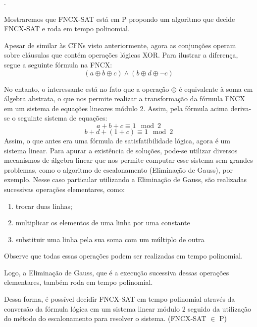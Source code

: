 \documentclass[12pt]{article}
\newcommand{\resposta}[1]{ \noindent {\bf Solução}.{\color{blue} #1}}
\begin{document}
\begin{enumerate}
  \resposta{
  
    Mostraremos que FNCX-SAT está em P propondo um algoritmo que decide FNCX-SAT e roda em tempo polinomial.
    
    Apesar de similar às CFNs visto anteriormente, agora as conjunções operam sobre cláusulas que contém operações lógicas XOR. Para ilustrar a diferença, segue a seguinte fórmula na FNCX:
    $$ (a \oplus b \oplus c) \land (b \oplus d \oplus \neg c)$$
    
    No entanto, o interessante está no fato que a operação $\oplus$ é equivalente à soma em álgebra abstrata, o que nos permite realizar a transformação da fórmula FNCX em um sistema de equações lineares módulo 2.
    Assim, pela fórmula acima deriva-se o seguinte sistema de equações:
    $$ a + b + c \equiv 1 \mod 2$$
    $$ b + d + (1+c) \equiv 1 \mod 2$$
	Assim, o que antes era uma fórmula de satisfatibilidade lógica, agora é um sistema linear. Para apurar a existência de soluções, pode-se utilizar diversos mecanismos de álgebra linear que nos permite computar esse sistema sem grandes problemas, como o algoritmo de escalonamento (Eliminação de Gauss), por exemplo.
    Nesse caso particular utilizando a Eliminação de Gauss, são realizadas sucessivas operações elementares, como:
    
\begin{enumerate}
\item trocar duas linhas;
\item multiplicar os elementos de uma linha por uma constante
\item substituir uma linha pela sua soma com um múltiplo de outra
\end{enumerate}
Observe que todas essas operações podem ser realizadas em tempo polinomial. 

Logo, a Eliminação de Gauss, que é a execução sucessiva dessas operações elementares, também roda em tempo polinomial.

Dessa forma, é possível decidir FNCX-SAT em tempo polinomial através da conversão da fórmula lógica em um sistema linear módulo 2 seguido da utilização do método do escalonamento para resolver o sistema. (FNCX-SAT $\in$ P)
  }
\end{enumerate}
\end{document}
